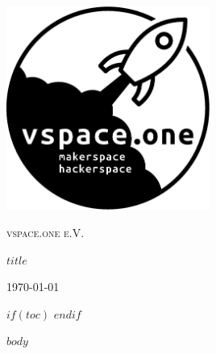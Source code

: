\documentclass[12pt,a4paper]{article}
\begin{document}
\begin{titlepage}
	\centering
	\includegraphics[width=0.5\textwidth]{pics/logo.eps}\par\vspace{1cm}
	{\scshape\LARGE vspace.one e.V.\par}
	\vspace{1cm}
	{\scshape\Large $title$ \par}

	\vfill

	{\large \today\par}
\end{titlepage}

$if(toc)$
{
\tableofcontents
\clearpage
}
$endif$


$body$
\end{document}

